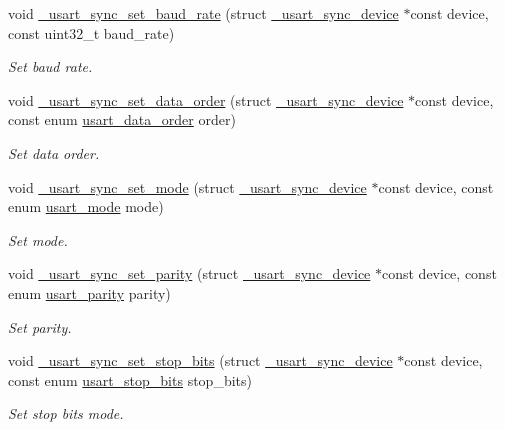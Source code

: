 \begin{DoxyCompactItemize}
void \hyperlink{group___h_p_l_ga882c8cecf50eb1276401d6874956b903}{\+\_\+usart\+\_\+sync\+\_\+set\+\_\+baud\+\_\+rate} (struct \hyperlink{struct__usart__sync__device}{\+\_\+usart\+\_\+sync\+\_\+device} $\ast$const device, const uint32\+\_\+t baud\+\_\+rate)
\begin{DoxyCompactList}\small\item\em Set baud rate. \end{DoxyCompactList}\item 
void \hyperlink{group___h_p_l_ga1b30e54d42d94ab59067e121d286d47a}{\+\_\+usart\+\_\+sync\+\_\+set\+\_\+data\+\_\+order} (struct \hyperlink{struct__usart__sync__device}{\+\_\+usart\+\_\+sync\+\_\+device} $\ast$const device, const enum \hyperlink{group___h_p_l_ga426849bbd9655cec091101ebc9123eb4}{usart\+\_\+data\+\_\+order} order)
\begin{DoxyCompactList}\small\item\em Set data order. \end{DoxyCompactList}\item 
void \hyperlink{group___h_p_l_ga2dd82ebe0069e4c61fda94ac0dda1a63}{\+\_\+usart\+\_\+sync\+\_\+set\+\_\+mode} (struct \hyperlink{struct__usart__sync__device}{\+\_\+usart\+\_\+sync\+\_\+device} $\ast$const device, const enum \hyperlink{group___h_p_l_ga1c465965478e0f6908a4c99d4f3ad20f}{usart\+\_\+mode} mode)
\begin{DoxyCompactList}\small\item\em Set mode. \end{DoxyCompactList}\item 
void \hyperlink{group___h_p_l_gaee0a2babdf7b777fa4754028c92fc2e8}{\+\_\+usart\+\_\+sync\+\_\+set\+\_\+parity} (struct \hyperlink{struct__usart__sync__device}{\+\_\+usart\+\_\+sync\+\_\+device} $\ast$const device, const enum \hyperlink{group___h_p_l_ga867cc5f0ea7d3bf651d68f0046cf6f41}{usart\+\_\+parity} parity)
\begin{DoxyCompactList}\small\item\em Set parity. \end{DoxyCompactList}\item 
void \hyperlink{group___h_p_l_ga93c7de4ab355c189e306288d21642ff3}{\+\_\+usart\+\_\+sync\+\_\+set\+\_\+stop\+\_\+bits} (struct \hyperlink{struct__usart__sync__device}{\+\_\+usart\+\_\+sync\+\_\+device} $\ast$const device, const enum \hyperlink{group___h_p_l_ga88311517c5168c29a681604a8a33b06e}{usart\+\_\+stop\+\_\+bits} stop\+\_\+bits)
\begin{DoxyCompactList}\small\item\em Set stop bits mode. \end{DoxyCompactList}\item 

\end{DoxyCompactItemize}
